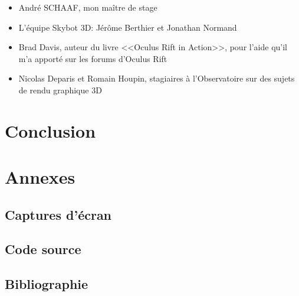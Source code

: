 \documentclass[a4paper,french,12pt]{article}
\begin{document}
	\begin{itemize}
	 \item André SCHAAF, mon maître de stage
	 \item L'équipe Skybot 3D: Jérôme Berthier et Jonathan Normand
	 \item Brad Davis, auteur du livre <<Oculus Rift in Action>>, pour l'aide qu'il m'a apporté sur les forums d'Oculus Rift
	 \item Nicolas Deparis et Romain Houpin, stagiaires à l'Observatoire sur des sujets de rendu graphique 3D
	\end{itemize}

\section{Conclusion}



\section{Annexes}
	
	\subsection{Captures d'écran}
		\newpage
	
	\subsection{Code source}
	
	
	\subsection{Bibliographie}
	

		
\end{document}

